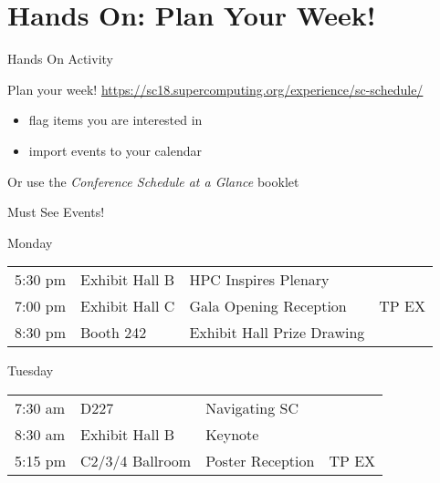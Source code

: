 \documentclass[presentation,xcolor=table]{beamer}
\begin{document}
\section{Hands On: Plan Your Week!}
\label{sec:org23c1771}
\begin{frame}[label={sec:org40ed90f}]{Hands On Activity}
\begin{block}{\centering Plan your week!}
\url{https://sc18.supercomputing.org/experience/sc-schedule/}
\begin{itemize}
\item flag items you are interested in
\item import events to your calendar
\end{itemize}

Or use the \emph{Conference Schedule at a Glance} booklet
\end{block}
\end{frame}

\begin{frame}[label={sec:org601751e}]{Must See Events!}
\begin{block}{Monday}
\begin{center}
\begin{tabular}{llll}
5:30 pm & Exhibit Hall B & \alert{HPC Inspires Plenary} & \\
7:00 pm & Exhibit Hall C & \alert{Gala Opening Reception} & \colorbox{sc18 red}{\color{white}TP EX}\\
8:30 pm & Booth 242 & \alert{Exhibit Hall Prize Drawing} & \\
\end{tabular}
\end{center}
\end{block}

\begin{block}{Tuesday}
\begin{center}
\begin{tabular}{llll}
7:30 am & D227 & \alert{Navigating SC} & \\
8:30 am & Exhibit Hall B & \alert{Keynote} & \hspace*{3cm}\\
5:15 pm & C2/3/4 Ballroom & \alert{Poster Reception} & \colorbox{sc18 red}{\color{white}TP EX}\\
\end{tabular}
\end{center}
\end{block}
\end{frame}
\end{document}
